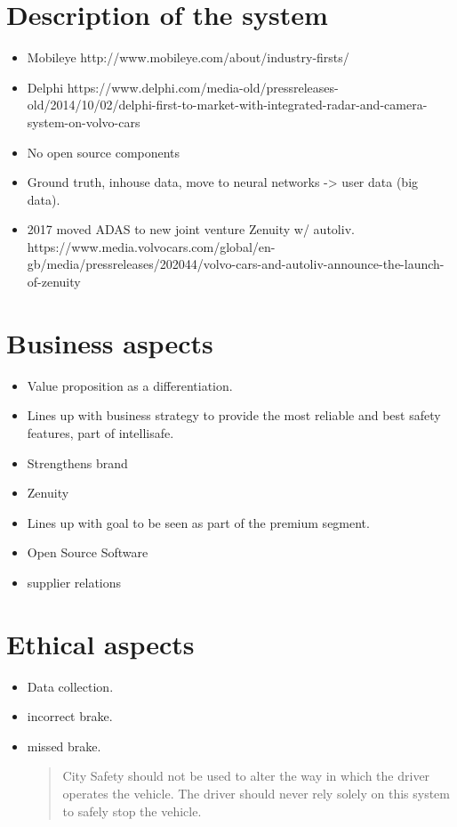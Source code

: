 \documentclass[conference]{IEEEtran}
\begin{document}
\section{Description of the system}
\begin{itemize}
	\item Mobileye http://www.mobileye.com/about/industry-firsts/
	\item Delphi https://www.delphi.com/media-old/pressreleases-old/2014/10/02/delphi-first-to-market-with-integrated-radar-and-camera-system-on-volvo-cars
	\item No open source components
	\item Ground truth, inhouse data, move to neural networks -> user data (big data).
	\item 2017 moved ADAS to new joint venture Zenuity w/ autoliv. https://www.media.volvocars.com/global/en-gb/media/pressreleases/202044/volvo-cars-and-autoliv-announce-the-launch-of-zenuity
\end{itemize}

\section{Business aspects}
\begin{itemize}
	\item Value proposition as a differentiation.
	\item Lines up with business strategy to provide the most reliable and best safety features, part of intellisafe.
	\item Strengthens brand
	\item Zenuity
	\item Lines up with goal to be seen as part of the premium segment.
	\item Open Source Software
	\item supplier relations
\end{itemize}
\section{Ethical aspects}
\begin{itemize}
	\item Data collection.
	\item incorrect brake.
	\item missed brake.
	\begin{quotation}
		City Safety should not be used to alter the way in which the driver operates the vehicle. The driver should never rely solely on this system to safely stop the vehicle.
	\end{quotation}
\end{itemize}
\end{document}
